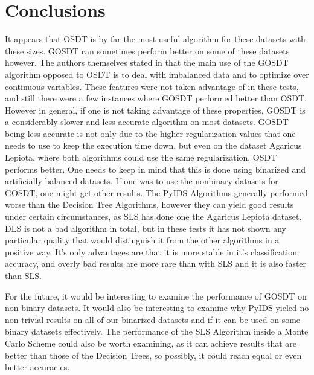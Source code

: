 \documentclass[a4paper,preprint]{sig-alternate-xt}
\begin{document}
\section{Conclusions}
\label{sec:conclusion}
It appears that OSDT is by far the most useful algorithm for these datasets with these sizes. GOSDT can sometimes perform better on some of these datasets however. The authors themselves stated in \cite{GOSDT} that the main use of the GOSDT algorithm opposed to OSDT is to deal with imbalanced data and to optimize over continuous variables. These features were not taken advantage of in these tests, and still there were a few instances where GOSDT performed better than OSDT. However in general, if one is not taking advantage of these properties, GOSDT is a considerably slower and less accurate algorithm on most datasets. GOSDT being less accurate is not only due to the higher regularization values that one needs to use to keep the execution time down, but even on the dataset Agaricus Lepiota, where both algorithms could use the same regularization, OSDT performs better. One needs to keep in mind that this is done using binarized and artificially balanced datasets. If one was to use the nonbinary datasets for GOSDT, one might get other results. 
The PyIDS Algorithms generally performed worse than the Decision Tree Algorithms, however they can yield good results under certain circumstances, as SLS has done one the Agaricus Lepiota dataset. DLS is not a bad algorithm in total, but in these tests it has not shown any particular quality that would distinguish it from the other algorithms in a positive way. It's only advantages are that it is more stable in it's classification accuracy, and overly bad results are more rare than with SLS and it is also faster than SLS. 

For the future, it would be interesting to examine the performance of GOSDT on non-binary datasets. It would also be interesting to examine why PyIDS yieled no non-trivial results on all of our binarized datasets and if it can be used on some binary datasets effectively. The performance of the SLS Algorithm inside a Monte Carlo Scheme could also be worth examining, as it can achieve results that are better than those of the Decision Trees, so possibly, it could reach equal or even better accuracies. 

%



\clearpage
\end{document}
